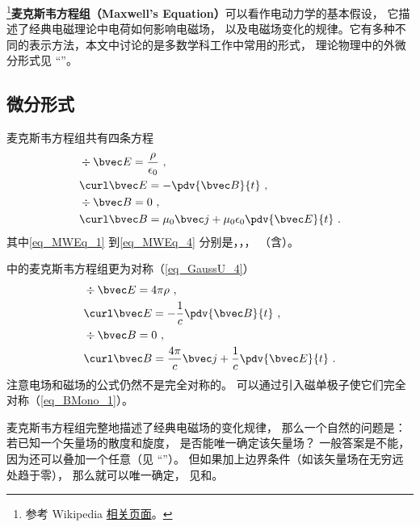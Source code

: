 
\begin{issues}
\end{issues}


\footnote{参考 Wikipedia \href{https://en.wikipedia.org/wiki/Maxwell's_equations}{相关页面}。}\textbf{麦克斯韦方程组（Maxwell's Equation）}可以看作电动力学的基本假设， 它描述了经典电磁理论中电荷如何影响电磁场， 以及电磁场变化的规律。它有多种不同的表示方法，本文中讨论的是多数学科工作中常用的形式， 理论物理中的外微分形式见 “”。

\subsection{微分形式}
麦克斯韦方程组共有四条方程
\begin{align}\label{eq_MWEq_1}
&\div \bvec E = \frac{\rho}{\epsilon_0}~,\\
\label{eq_MWEq_2}
&\curl \bvec E = -\pdv{\bvec B}{t}~,\\
\label{eq_MWEq_3}
&\div \bvec B = 0~,\\
\label{eq_MWEq_4}
&\curl \bvec B = \mu_0 \bvec j + \mu_0\epsilon_0 \pdv{\bvec E}{t}~.
\end{align}
其中\autoref{eq_MWEq_1} 到\autoref{eq_MWEq_4} 分别是，，， （含）。

中的麦克斯韦方程组更为对称（\autoref{eq_GaussU_4}）
\begin{equation}
\begin{aligned}
&\div \bvec E = 4\pi\rho~,\\
&\curl \bvec E = -\frac{1}{c}\pdv{\bvec B}{t}~,\\
&\div \bvec B = 0 ~,\\
&\curl \bvec B = \frac{4\pi}{c} \bvec j + \frac{1}{c}\pdv{\bvec E}{t}~.
\end{aligned}
\end{equation}
注意电场和磁场的公式仍然不是完全对称的。 可以通过引入磁单极子使它们完全对称（\autoref{eq_BMono_1}）。

麦克斯韦方程组完整地描述了经典电磁场的变化规律， 那么一个自然的问题是： 若已知一个矢量场的散度和旋度， 是否能唯一确定该矢量场？ 一般答案是不能， 因为还可以叠加一个任意（见 “”）。 但如果加上边界条件（如该矢量场在无穷远处趋于零）， 那么就可以唯一确定， 见和。

